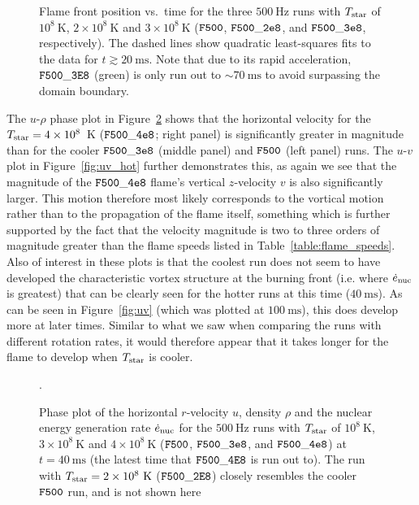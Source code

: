 \documentclass[preprint,times,tighten]{aastex63}
\begin{document}
\begin{figure}[t]
	\centering
	\caption{\label{fig:flame_speeds_2} Flame front position vs.\ time for the three $500~\mathrm{Hz}$ runs with
		$T_{\rm star}$ of $10^8~\mathrm{K}$, $2\times10^8~\mathrm{K}$ and $3\times10^8~\mathrm{K}$ ($\tt{F500}$, $\tt{F500\_2e8}$, and $\tt{F500\_3e8}$, respectively). The dashed lines show quadratic least-squares fits to the data
		for $t \gtrsim 20~\mathrm{ms}$. Note that due to its rapid acceleration, $\tt{F500\_3E8}$ 
		(green) is only run out to $\sim 70~\mathrm{ms}$ to avoid surpassing the domain boundary.}
\end{figure}

The $u$-$\rho$ phase plot in Figure~\ref{fig:urho_hot} shows that the horizontal velocity for the $T_{\rm star} = 4\times10^8$~K ($\tt{F500\_4e8}$; right panel) is significantly greater in magnitude than for the cooler $\tt{F500\_3e8}$ (middle panel) and $\tt{F500}$ (left panel) runs. The $u$-$v$ plot in Figure~\ref{fig:uv_hot} further demonstrates this, as again we see that the magnitude of the $\tt{F500\_4e8}$ flame's vertical $z$-velocity $v$ is also significantly larger. This motion therefore most likely corresponds to the vortical motion rather than to the propagation of the flame itself, something which is further supported by the fact that the velocity magnitude is two to three orders of magnitude greater than the flame speeds listed in Table~\ref{table:flame_speeds}. Also of interest in these plots is that the coolest run does not seem to have developed the characteristic vortex structure at the burning front (i.e. where $\dot{e}_{\rm nuc}$ is greatest) that can be clearly seen for the hotter runs at this time ($40~\mathrm{ms}$). As can be seen in Figure~\ref{fig:uv} (which was plotted at $100~\mathrm{ms}$), this does develop more at later times. Similar to what we saw when comparing the runs with different rotation rates, it would therefore appear that it takes longer for the flame to develop when $T_{\rm star}$ is cooler. 

\begin{figure}[t]
    \centering
    \caption{\label{fig:urho_hot}Phase plot of the horizontal $r$-velocity $u$, density $\rho$ and the nuclear energy generation rate $\dot{e}_{\rm nuc}$ for the $500~\mathrm{Hz}$ runs with $T_{\rm star}$ of $10^8~\mathrm{K}$, $3\times10^8~\mathrm{K}$ and $4\times10^8~\mathrm{K}$ ($\tt{F500}$, $\tt{F500\_3e8}$, and $\tt{F500\_4e8}$) at $t = 40~\mathrm{ms}$ (the latest time that $\tt{F500\_4E8}$ is run out to). The run with $T_{\rm star} = 2\times10^8~\mathrm{K}$ ($\tt{F500\_2E8}$) closely resembles the cooler $\tt{F500}$ run, and is not shown here}.
\end{figure}
\end{document}
